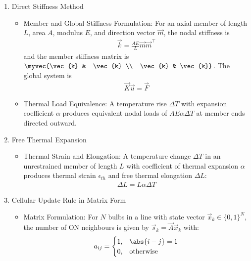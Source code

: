\begin{enumerate}[label=\thesubsection.\arabic*, ref=\thesubsection.\theenumi,itemsep=0pt]
\item Direct Stiffness Method
\begin{itemize}
\item Member and Global Stiffness Formulation:
For an axial member of length $L$, area $A$, modulus $E$, and direction vector $\vec{m}$, the nodal stiffness is
\begin{align} %
\vec{k} = \frac{AE}{L}\vec{m}\vec{m}^\top
\label{eq:kbar} %
\end{align}
and the member stiffness matrix is $\myvec{\vec{k} & -\vec{k} \\ -\vec{k} & \vec{k}}$. The global system is
\begin{align} %
\vec{K}\vec{u} = \vec{F}
\label{eq:kuf} %
\end{align}
\item Thermal Load Equivalence:
A temperature rise $\Delta T$ with expansion coefficient $\alpha$ produces equivalent nodal loads of $AE\alpha\Delta T$ at member ends directed outward.
\end{itemize}
\item Free Thermal Expansion
\begin{itemize}
\item Thermal Strain and Elongation:
A temperature change $\Delta T$ in an unrestrained member of length $L$ with coefficient of thermal expansion $\alpha$ produces thermal strain $\epsilon_{th}$ and free thermal elongation $\Delta L$:
\begin{align}
\Delta L = L \alpha \Delta T
\label{eq:free}
\end{align}
\end{itemize}

\item Cellular Update Rule in Matrix Form
\begin{itemize}
\item Matrix Formulation:
For $N$ bulbs in a line with state vector $\vec{x}_k \in \{0, 1\}^N$, the number of ON neighbours is given by $\vec{s}_k = \vec{A}\vec{x}_k$ with:
\begin{align}
a_{ij} = \begin{cases} 1, & \abs{i - j} = 1 \\ 0, & \text{otherwise} \end{cases}
\label{eq:adj} %
\end{align}
\end{itemize}



\end{enumerate}
